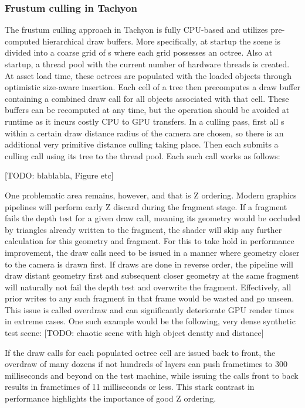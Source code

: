 \subsubsection{Frustum culling in Tachyon}
The frustum culling approach in Tachyon is fully CPU-based and utilizes pre-computed hierarchical draw buffers. More specifically, at startup the scene is divided into a coarse grid of s where each grid possesses an octree. Also at startup, a thread pool with the current number of hardware threads is created. At asset load time, these octrees are populated with the loaded objects through optimistic size-aware insertion. Each cell of a tree then precomputes a draw buffer containing a combined draw call for all objects associated with that cell. These buffers can be recomputed at any time, but the operation should be avoided at runtime as it incurs costly CPU to GPU transfers. 
In a culling pass, first all s within a certain draw distance radius of the camera are chosen, so there is an additional very primitive distance culling taking place. Then each  submits a culling call using its tree to the thread pool. Each such call works as follows: 

[TODO: blablabla, Figure etc]

One problematic area remains, however, and that is Z ordering. Modern graphics pipelines will perform early Z discard during the fragment stage. If a fragment fails the depth test for a given draw call, meaning its geometry would be occluded by triangles already written to the fragment, the shader will skip any further calculation for this geometry and fragment. For this to take hold in performance improvement, the draw calls need to be issued in a manner where geometry closer to the camera is drawn first. If draws are done in reverse order, the pipeline will draw distant geometry first and subsequent closer geometry at the same fragment will naturally not fail the depth test and overwrite the fragment. Effectively, all prior writes to any such fragment in that frame would be wasted and go unseen. This issue is called overdraw and can significantly deteriorate GPU render times in extreme cases. 
One such example would be the following, very dense synthetic test scene: [TODO: chaotic scene with high object density and distance]

If the draw calls for each populated octree cell are issued back to front, the overdraw of many dozens if not hundreds of layers can push frametimes to 300 milliseconds and beyond on the test machine, while issuing the calls front to back results in frametimes of 11 milliseconds or less. 
This stark contrast in performance highlights the importance of good Z ordering. 

